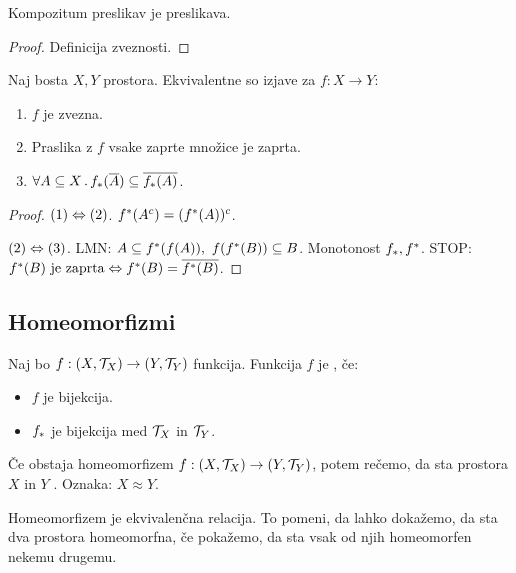 \begin{trditev}
    Kompozitum preslikav je preslikava.
\end{trditev}

\begin{proof}
    Definicija zveznosti.
\end{proof}

\begin{trditev}
    Naj bosta $X, Y$ prostora. Ekvivalentne so izjave za $f: X \to Y$:
    \begin{enumerate}
        \item $f$ je zvezna.
        \item Praslika z $f$ vsake zaprte množice je zaprta.
        \item $\forall A \subseteq X \,.\, f_{*}(\overline{A}) \subseteq \overline{f_{*}(A)}$.
    \end{enumerate}
\end{trditev}

\begin{proof}
    $(1) \Leftrightarrow (2)$. $f^{*}(A^c) = (f^{*}(A))^c$.

    $(2) \Leftrightarrow (3)$. LMN: $A \subseteq f^{*}(f(A)), \ f(f^{*}(B)) \subseteq B$. Monotonost $f_{*}, f^{*}$. STOP:
    $f^{*}(B) \text{ je zaprta} \Leftrightarrow f^{*}(B) = \overline{f^{*}(B)}$.
\end{proof}

\newpage
\subsection{Homeomorfizmi}
\begin{definicija}
    Naj bo $f: (X, \mathcal{T}_X) \to (Y, \mathcal{T}_Y)$ funkcija. Funkcija $f$ je , če:
    \begin{itemize}
        \item $f$ je bijekcija.
        \item $f_{*}$ je bijekcija med $\mathcal{T}_X$ in $\mathcal{T}_Y$.
    \end{itemize}
\end{definicija}

\begin{definicija}
    Če obstaja homeomorfizem $f: (X, \mathcal{T}_X) \to (Y, \mathcal{T}_Y)$, potem rečemo, da sta prostora $X$ in $Y$ . Oznaka: $X \approx  Y$.
\end{definicija}

\begin{opomba}
    Homeomorfizem je ekvivalenčna relacija. To pomeni, da lahko dokažemo, da sta dva prostora homeomorfna, če pokažemo, da sta vsak od njih homeomorfen nekemu drugemu.
\end{opomba}

